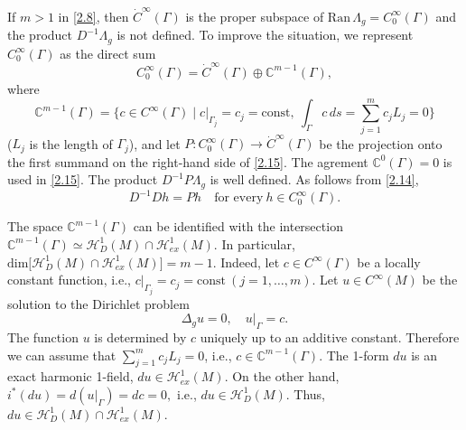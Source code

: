 \documentclass[12pt,reqno]{amsart}
\begin{document}
If $m>1$ in \eqref{2.8}, then $ \dot C^\infty(\Gamma)$ is the proper subspace of $\mbox{Ran}\,\Lambda_g=C^\infty_0(\Gamma)$ and the product $D^{-1}\Lambda_g$ is not defined. To improve the situation, we represent $C^\infty_0(\Gamma)$ as the direct sum
\begin{equation}
C^\infty_0(\Gamma)=\dot C^\infty(\Gamma)\oplus{\mathbb C}^{m-1}(\Gamma),
                                \label{2.15}
\end{equation}
where
\begin{equation}
{\mathbb C}^{m-1}(\Gamma)=\Big\{c\in C^\infty(\Gamma)\mid c|_{\Gamma_j}=c_j=\mbox{const},\ \int_\Gamma c\,ds=
\sum\limits_{j=1}^m c_jL_j=0\Big\}
                                \label{2.16}
\end{equation}
($L_j$ is the length of $\Gamma_j$), and let
$
P:C^\infty_0(\Gamma)\to\dot C^\infty(\Gamma)
$
be the projection onto the first summand on the right-hand side of \eqref{2.15}. The agrement ${\mathbb C}^0(\Gamma)=0$ is used in \eqref{2.15}.
The product $D^{-1}P\Lambda_g$ is well defined. As follows from \eqref{2.14},
\begin{equation}
D^{-1}Dh=Ph\quad\mbox{for every}\ h\in C^\infty_0(\Gamma).
                                \label{2.17}
\end{equation}

The space ${\mathbb C}^{m-1}(\Gamma)$ can be identified with the intersection
$
{\mathbb C}^{m-1}(\Gamma)\simeq{\mathcal H}^1_D(M)\cap{\mathcal H}^1_{ex}(M).
$
In particular,
$
\mbox{dim}\big[{\mathcal H}^1_D(M)\cap{\mathcal H}^1_{ex}(M)\big]=m-1.
$
Indeed, let $c\in C^\infty(\Gamma)$ be a locally constant function, i.e., $c|_{\Gamma_j}=c_j=\mbox{const}\ (j=1,\dots, m)$.
Let $u\in C^\infty(M)$ be the solution to the Dirichlet problem
$$
\Delta_gu=0,\quad u|_\Gamma=c.
$$
The function $u$ is determined by $c$ uniquely up to an additive constant. Therefore we can assume that $\sum_{j=1}^mc_jL_j=0$, i.e.,
$c\in{\mathbb C}^{m-1}(\Gamma)$. The 1-form $du$ is an exact harmonic 1-field, $du\in{\mathcal H}^1_{ex}(M)$. On the other hand,
$
i^*(du)=d(u|_\Gamma)=dc=0,
$
i.e., $du\in{\mathcal H}^1_D(M)$. Thus, $du\in{\mathcal H}^1_D(M)\cap{\mathcal H}^1_{ex}(M)$.
\end{document}
